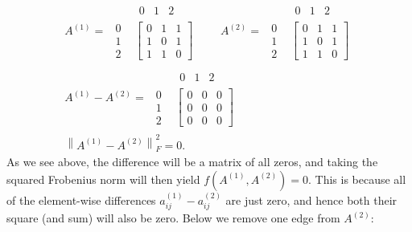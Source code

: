 \begin{align*}
A^{(1)} = 
\begin{array}{cc} &
\begin{array}{ccc} 0 & 1 & 2 \end{array}
\\
\begin{array}{cc}
0 \\
1 \\
2 \end{array}
&
\left[
\begin{array}{ccc}
0 & 1 & 1\\
1 & 0 & 1\\
1 & 1 & 0\end{array}
\right]\end{array}
\quad \quad
A^{(2)} = 
\begin{array}{cc} &
\begin{array}{ccc} 0 & 1 & 2 \end{array}
\\
\begin{array}{ccc}
0 \\
1 \\
2 \end{array}
&
\left[
\begin{array}{ccc}
0 & 1 & 1\\
1 & 0 & 1\\
1 & 1 & 0\end{array}
\right]\end{array}
\\
A^{(1)}-A^{(2)} =
\begin{array}{cc} &
\begin{array}{ccc} 0 & 1 & 2 \end{array}
\\
\begin{array}{ccc}
0 \\
1 \\
2 \end{array}
&
\left[
\begin{array}{ccc}
0 & 0 & 0\\
0 & 0 & 0\\
0 & 0 & 0\end{array}
\right]\end{array}
\\
\left\|A^{(1)} - A^{(2)}\right\|_F^2 = 0.
\end{align*}
As we see above, the difference will be a matrix of all zeros, and taking the squared Frobenius norm will then yield $f\left(A^{(1)}, A^{(2)}\right) = 0$. This is because all of the element-wise differences $a_{ij}^{(1)} - a_{ij}^{(2)}$ are just zero, and hence both their square (and sum) will also be zero. Below we remove one edge from $A^{(2)}$:

